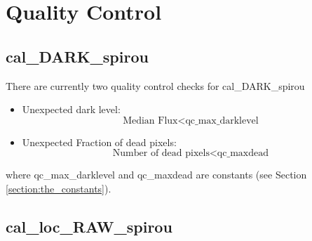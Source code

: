  \chapter{Quality Control}



\section{cal\_DARK\_spirou}
\label{section:qc_cal_DARK_spirou}


There are currently two quality control checks for cal\_DARK\_spirou
\begin{itemize}
\item Unexpected dark level: 
	\begin{equation}
	\text{Median Flux} < \text{qc\_max\_darklevel}
	\end{equation}

\item Unexpected Fraction of dead pixels: 
	\begin{equation}
	\text{Number of dead pixels} < \text{qc\_maxdead}
	\end{equation}
\end{itemize}

\noindent where qc\_max\_darklevel and qc\_maxdead are constants (see Section \ref{section:the_constants}).


\section{cal\_loc\_RAW\_spirou}
\label{section:qc_cal_loc_RAW_spirou}



